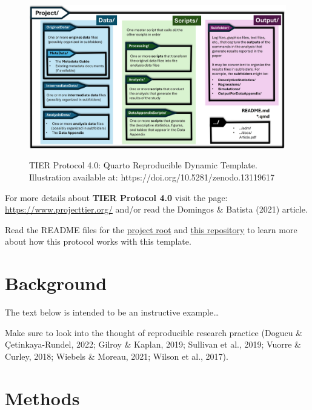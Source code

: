 \documentclass[
  a4paper,
]{article}
\begin{document}
\begin{figure}

\href{https://doi.org/10.5281/zenodo.13119617}{\includegraphics{Output/tier-folders.jpg}}

\caption{\label{fig-tier-folders}TIER Protocol 4.0: Quarto Reproducible
Dynamic Template. Illustration available at:
https://doi.org/10.5281/zenodo.13119617}

\end{figure}%

For more details about \textbf{TIER Protocol 4.0} visit the page:
\url{https://www.projecttier.org/} and/or read the Domingos \& Batista
(2021) article.

Read the README files for the
\href{https://github.com/phdpablo/article-template/tree/master/project}{project
root} and \href{https://github.com/phdpablo/article-template}{this
repository} to learn more about how this protocol works with this
template.


\section{Background}\label{background}

The text below is intended to be an instructive example\ldots{}

Make sure to look into the thought of reproducible research practice
(Dogucu \& Çetinkaya-Rundel, 2022; Gilroy \& Kaplan, 2019; Sullivan et
al., 2019; Vuorre \& Curley, 2018; Wiebels \& Moreau, 2021; Wilson et
al., 2017).


\section{Methods}\label{methods}
\end{document}
